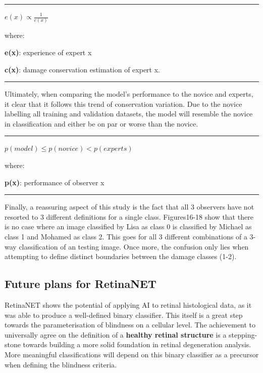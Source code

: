 \documentclass[a4paper]{article}
\begin{document}
    \noindent\rule{17cm}{0.4pt}
    \begin{center}
        \textbf{{\huge $e(x) \propto \frac{1}{c(x)}$ }}\\
    \end{center}
    where:
    \vspace{3mm}
    
    \textbf{e(x)}: experience of expert x
    \vspace{3mm}
    
    \textbf{c(x)}: damage conservation estimation of expert x.\\
    \noindent\rule{17cm}{0.4pt}
    \vspace{3mm}

    Ultimately, when comparing the model's performance to the novice and experts, it clear that it follows this trend of conservation variation. Due to the novice labelling all training and validation datasets, the model will resemble the novice in classification and either be on par or worse than the novice.  
    
    \noindent\rule{17cm}{0.4pt}
    \begin{center}
        \textbf{{\huge $p(model) \leq p(novice) < p (experts)$ }}\\
    \end{center}
    where:
    \vspace{3mm}

    \textbf{p(x)}: performance of observer x\\
    \noindent\rule{17cm}{0.4pt}
    \vspace{3mm}

    Finally, a reassuring aspect of this study is the fact that all 3 observers have not resorted to 3 different definitions for a single class. Figures16-18 show that there is no case where an image classified by Lisa as class 0 is classified by Michael as class 1 and Mohamed as class 2. This goes for all 3 different combinations of a 3-way classification of an testing image. Once more, the confusion only lies when attempting to define distinct boundaries between the damage classes (1-2).     


    \subsection{Future plans for RetinaNET} 
    RetinaNET shows the potential of applying AI to retinal histological data, as it was able to produce a well-defined binary classifier. This itself is a great step towards the parameterisation of blindness on a cellular level. The achievement to universally agree on the definition of a \textbf{healthy retinal structure} is a stepping-stone towards building a more solid foundation in retinal degeneration analysis. More meaningful classifications will depend on this binary classifier as a precursor when defining the blindness criteria. 
    \vspace{3mm}
    
\end{document}
